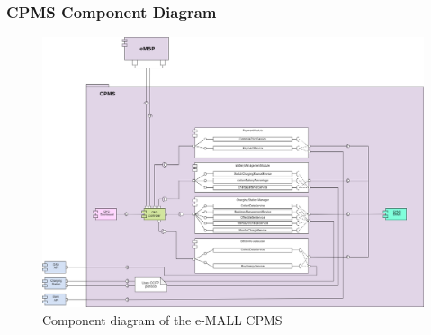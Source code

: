 \documentclass[12pt]{report}
\begin{document}
\subsubsection{CPMS Component Diagram}
\begin{figure}[h]
    \hspace*{-2.5cm} 
    \centering
    \includegraphics[width = 1.3\textwidth]{assets/component_cpms.png}
    \caption{Component diagram of the e-MALL CPMS}
    \label{fig:my_label8}
\end{figure}
\end{document}
